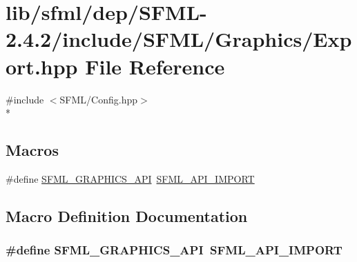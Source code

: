 \hypertarget{sfml_2dep_2_s_f_m_l-2_84_82_2include_2_s_f_m_l_2_graphics_2_export_8hpp}{\section{lib/sfml/dep/\-S\-F\-M\-L-\/2.4.2/include/\-S\-F\-M\-L/\-Graphics/\-Export.hpp File Reference}
\label{sfml_2dep_2_s_f_m_l-2_84_82_2include_2_s_f_m_l_2_graphics_2_export_8hpp}
}
{\ttfamily \#include $<$S\-F\-M\-L/\-Config.\-hpp$>$}\\*
\subsection*{Macros}
\begin{DoxyCompactItemize}
\item 
\#define \hyperlink{sfml_2dep_2_s_f_m_l-2_84_82_2include_2_s_f_m_l_2_graphics_2_export_8hpp_ab84c9f1035e146917de3bc0f98d72b35}{S\-F\-M\-L\-\_\-\-G\-R\-A\-P\-H\-I\-C\-S\-\_\-\-A\-P\-I}~\hyperlink{sfml_2dep_2_s_f_m_l-2_84_82_2include_2_s_f_m_l_2_config_8hpp_aba0bbe5791bee6633caa835c7f6a12a4}{S\-F\-M\-L\-\_\-\-A\-P\-I\-\_\-\-I\-M\-P\-O\-R\-T}
\end{DoxyCompactItemize}


\subsection{Macro Definition Documentation}
\hypertarget{sfml_2dep_2_s_f_m_l-2_84_82_2include_2_s_f_m_l_2_graphics_2_export_8hpp_ab84c9f1035e146917de3bc0f98d72b35}{
\subsubsection[{S\-F\-M\-L\-\_\-\-G\-R\-A\-P\-H\-I\-C\-S\-\_\-\-A\-P\-I}]{\setlength{\rightskip}{0pt plus 5cm}\#define S\-F\-M\-L\-\_\-\-G\-R\-A\-P\-H\-I\-C\-S\-\_\-\-A\-P\-I~{\bf S\-F\-M\-L\-\_\-\-A\-P\-I\-\_\-\-I\-M\-P\-O\-R\-T}}}\label{sfml_2dep_2_s_f_m_l-2_84_82_2include_2_s_f_m_l_2_graphics_2_export_8hpp_ab84c9f1035e146917de3bc0f98d72b35}
